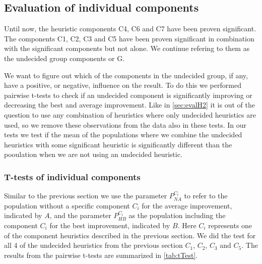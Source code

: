 \documentclass[../main.tex]{subfiles}
\begin{document}
\subsection{Evaluation of individual components}
\label{sec:evalI}
Until now, the heuristic components C4, C6 and C7 have been proven significant.
The components C1, C2, C3 and C5 have been proven significant in combination with the significant components but not alone.
We continue refering to them as the undecided group components or G. 
\par
We want to figure out which of the components in the undecided group, if any, have a positive, or negative, influence on the result.
To do this we performed pairwise t-tests to check if an undecided component is significantly improving or decreasing the best and average improvement.
Like in \cref{sec:evalH2} it is out of the question to use any combination of heuristics where only undecided heuristics are used, so we remove these observations from the data also in these tests.
In our tests we test if the mean of the populations where we combine the undecided heuristics with some significant heuristic is significantly different than the pooulation when we are not using an undecided heuristic. 

\subsubsection{T-tests of individual components}
Similar to the previous section we use the parameter $P^{C_i}_{NA}$ to refer to the population without a specific component $C_i$ for the average improvement, indicated by $A$, and the parameter $P^{C_i}_{HB}$ as the population including the component $C_i$ for the best improvement, indicated by $B$. 
Here $C_i$ represents one of the component heuristics described in the previous section. 
We did the test for all 4 of the undecided heuristics from the previous section $C_1$, $C_2$, $C_3$ and $C_5$.
The results from the pairwise t-tests are summarized in \ref{tab:tTest}.
\end{document}
